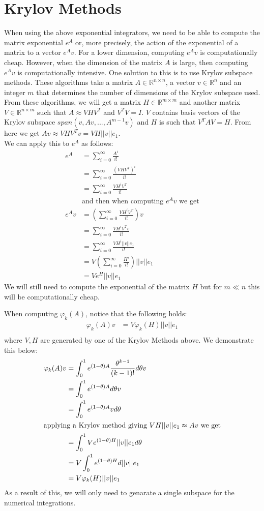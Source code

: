 \section{Krylov Methods}
When using the above exponential integrators, we need to be able to compute the matrix exponential $e^{A}$ or, more precisely, the action of the exponential of a matrix to a vector $e^{A}v$.
For a lower dimension, computing $e^{A}v$ is computationally cheap.
However, when the dimension of the matrix $A$ is large, then computing $e^{A}v$ is computationally intensive.
One solution to this is to use Krylov subspace methods.
These algorithms take a matrix $A\in \mathbb{R}^{n\times n}$, a vector $v \in \mathbb{R}^n$ and an integer $m$ that determines the number of dimensions of the Krylov subspace used.
From these algorithms, we will get a matrix $H \in \mathbb{R}^{m\times m}$ and another matrix $V \in \mathbb{R}^{n\times m}$ such that $A \approx VHV^T$ and $V^TV = I$.
$V$ contains basis vectors of the Krylov subspace $span(v, Av, ..., A^{m-1}v)$ and $H$ is such that $V^TAV = H$.
From here we get $Av \approx VHV^Tv = VH||v||e_1$.\\
We can apply this to $e^A$ as follows:
\begin{align*}
e^A &= \sum^{\infty}_{i=0}\frac{A^i}{i!}\\
&= \sum^{\infty}_{i=0}\frac{(VHV^T)^i}{i!} \\
&= \sum^{\infty}_{i=0}\frac{VH^iV^T}{i!} \\
&\text {and then when computing $e^Av$ we get}\\
e^Av &= (\sum^{\infty}_{i=0}\frac{VH^iV^T}{i!})v \\
&= \sum^{\infty}_{i=0}\frac{VH^iV^Tv}{i!} \\
&= \sum^{\infty}_{i=0}\frac{VH^i||v||e_1}{i!} \\
&= V(\sum^{\infty}_{i=0}\frac{H^i}{i!})||v||e_1 \\
&= Ve^H||v||e_1
\end{align*}
We will still need to compute the exponential of the matrix $H$ but for $m\ll n$ this will be computationally cheap.

When computing $\varphi_k(A)$, notice that the following holds:
\begin{align*}
    \varphi_k(A)v &= V\varphi_k(H)||v||e_1\\
\end{align*}
where $V,H$ are generated by one of the Krylov Methods above. 
We demonstrate this below:
\begin{align*}
    \varphi_k(A)v &= \int^1_0e^{(1-\theta)A}\frac{\theta^{k-1}}{(k-1)!}d\theta v\\
    &= \int^1_0e^{(1-\theta) A}d\theta v\\
    &= \int^1_0e^{(1-\theta) A}vd\theta\\
\intertext{applying a Krylov method giving $VH||v||e_1 \approx Av$ we get}
    &= \int^1_0Ve^{(1-\theta) H}||v||e_1d\theta\\
    &= V\int^1_0e^{(1-\theta) H}d||v||e_1\\
    &= V\varphi_k(H)||v||e_1
\end{align*}
As a result of this, we will only need to genarate a single subspace for the numerical integrations.

